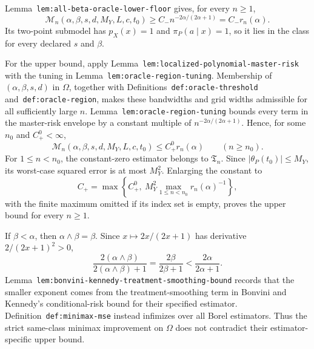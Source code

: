 Lemma~\texttt{lem:all-beta-oracle-lower-floor} gives, for every \(n\ge1\),
\[
\mathcal M_n(\alpha,\beta,s,d,M_Y,L,c,t_0)
\ge C_-n^{-2\alpha/(2\alpha+1)}=C_-r_n(\alpha).
\]
Its two-point submodel has \(p_X(x)=1\) and \(\pi_P(a\mid x)=1\), so it lies in the class for every declared \(s\) and \(\beta\).

For the upper bound, apply Lemma~\texttt{lem:localized-polynomial-master-risk} with the tuning in Lemma~\texttt{lem:oracle-region-tuning}. Membership of \((\alpha,\beta,s,d)\) in \(\Omega\), together with Definitions~\texttt{def:oracle-threshold} and~\texttt{def:oracle-region}, makes these bandwidths and grid widths admissible for all sufficiently large \(n\). Lemma~\texttt{lem:oracle-region-tuning} bounds every term in the master-risk envelope by a constant multiple of \(n^{-2\alpha/(2\alpha+1)}\). Hence, for some \(n_0\) and \(C_+^0<\infty\),
\[
\mathcal M_n(\alpha,\beta,s,d,M_Y,L,c,t_0)
\le C_+^0r_n(\alpha)
\qquad(n\ge n_0).
\]
For \(1\le n<n_0\), the constant-zero estimator belongs to \(\mathfrak T_n\). Since \(\lvert\theta_P(t_0)\rvert\le M_Y\), its worst-case squared error is at most \(M_Y^2\). Enlarging the constant to
\[
C_+=\max\left\{C_+^0,\ M_Y^2\max_{1\le n<n_0}r_n(\alpha)^{-1}\right\},
\]
with the finite maximum omitted if its index set is empty, proves the upper bound for every \(n\ge1\).

If \(\beta<\alpha\), then \(\alpha\wedge\beta=\beta\). Since \(x\mapsto2x/(2x+1)\) has derivative \(2/(2x+1)^2>0\),
\[
\frac{2(\alpha\wedge\beta)}{2(\alpha\wedge\beta)+1}
=
\frac{2\beta}{2\beta+1}
<
\frac{2\alpha}{2\alpha+1}.
\]
Lemma~\texttt{lem:bonvini-kennedy-treatment-smoothing-bound} records that the smaller exponent comes from the treatment-smoothing term in Bonvini and Kennedy's conditional-risk bound for their specified estimator. Definition~\texttt{def:minimax-mse} instead infimizes over all Borel estimators. Thus the strict same-class minimax improvement on \(\Omega\) does not contradict their estimator-specific upper bound.